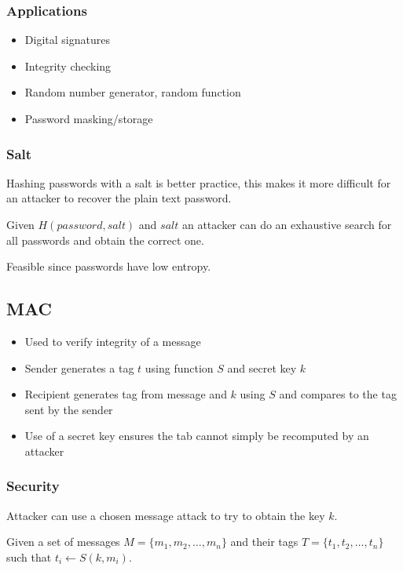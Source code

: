 \documentclass[a4paper]{article}
\begin{document}
\subsubsection{Applications}

\begin{itemize}
  \item Digital signatures
  \item Integrity checking
  \item Random number generator, random function
  \item Password masking/storage
\end{itemize}

\subsubsection{Salt}

Hashing passwords with a salt is better practice, this makes it more difficult
for an attacker to recover the plain text password.


Given $H(password, salt)$ and $salt$ an attacker can do an exhaustive search for
all passwords and obtain the correct one.

Feasible since passwords have low entropy.

\subsection{MAC}

\begin{itemize}
  \item Used to verify integrity of a message
  \item Sender generates a tag $t$ using function $S$ and secret key $k$
  \item Recipient generates tag from message and $k$ using $S$ and compares to
        the tag sent by the sender
  \item Use of a secret key ensures the tab cannot simply be recomputed by an
        attacker
\end{itemize}

\subsubsection{Security}

Attacker can use a chosen message attack to try to obtain the key $k$.

Given a set of messages $M = \{m_{1}, m_{2}, \ldots, m_{n}\}$ and their tags $T
= \{t_{1}, t_{2}, \ldots, t_{n}\}$ such that $t_{i} \leftarrow S(k, m_{i})$.
\end{document}
